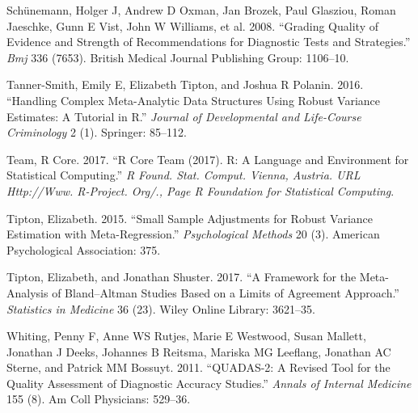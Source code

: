 \documentclass[smallextended]{svjour3}       %
\begin{document}
\leavevmode\hypertarget{ref-schunemann2008grading}{}%
Schünemann, Holger J, Andrew D Oxman, Jan Brozek, Paul Glasziou, Roman
Jaeschke, Gunn E Vist, John W Williams, et al. 2008. ``Grading Quality
of Evidence and Strength of Recommendations for Diagnostic Tests and
Strategies.'' \emph{Bmj} 336 (7653). British Medical Journal Publishing
Group: 1106--10.

\leavevmode\hypertarget{ref-tanner2016handling}{}%
Tanner-Smith, Emily E, Elizabeth Tipton, and Joshua R Polanin. 2016.
``Handling Complex Meta-Analytic Data Structures Using Robust Variance
Estimates: A Tutorial in R.'' \emph{Journal of Developmental and
Life-Course Criminology} 2 (1). Springer: 85--112.

\leavevmode\hypertarget{ref-team2017r}{}%
Team, R Core. 2017. ``R Core Team (2017). R: A Language and Environment
for Statistical Computing.'' \emph{R Found. Stat. Comput. Vienna,
Austria. URL Http://Www. R-Project. Org/., Page R Foundation for
Statistical Computing}.

\leavevmode\hypertarget{ref-tipton2015small}{}%
Tipton, Elizabeth. 2015. ``Small Sample Adjustments for Robust Variance
Estimation with Meta-Regression.'' \emph{Psychological Methods} 20 (3).
American Psychological Association: 375.

\leavevmode\hypertarget{ref-tipton2017framework}{}%
Tipton, Elizabeth, and Jonathan Shuster. 2017. ``A Framework for the
Meta-Analysis of Bland--Altman Studies Based on a Limits of Agreement
Approach.'' \emph{Statistics in Medicine} 36 (23). Wiley Online Library:
3621--35.

\leavevmode\hypertarget{ref-whiting2011quadas}{}%
Whiting, Penny F, Anne WS Rutjes, Marie E Westwood, Susan Mallett,
Jonathan J Deeks, Johannes B Reitsma, Mariska MG Leeflang, Jonathan AC
Sterne, and Patrick MM Bossuyt. 2011. ``QUADAS-2: A Revised Tool for the
Quality Assessment of Diagnostic Accuracy Studies.'' \emph{Annals of
Internal Medicine} 155 (8). Am Coll Physicians: 529--36.



\end{document}
